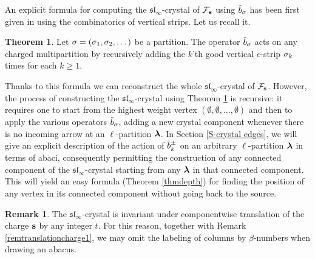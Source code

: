 \documentclass[12pt]{amsart}
\numberwithin{equation}{section}
\theoremstyle{definition}
\newtheorem{theorem}[equation]{Theorem}
\newtheorem{remark}[equation]{Remark}
\newcommand{\emp}{\emptyset}
\newcommand{\slinf}{\mathfrak{sl}_\infty}
\begin{document}
An explicit formula for computing the $\slinf$-crystal of $\mathcal{F}_{\mathbf{s}}$ using ${\tilde{b}}_\sigma$ has been first
given in \cite[Theorem 5.11]{Gerber2016a} using the combinatorics of vertical strips. Let us recall it.

\begin{theorem}\label{thmverticalstrips} Let $\sigma=(\sigma_1,\sigma_2,\dots)$ be a partition.
The operator ${\tilde{b}}_\sigma$ acts on any charged multipartition by recursively adding 
the $k$'th good vertical $e$-strip $\sigma_k$ times for each $k\geq1$.
\end{theorem}

Thanks to this formula we can reconstruct the whole $\slinf$-crystal of $\mathcal{F}_{\mathbf{s}}$. 
However, the process of constructing the $\slinf$-crystal using Theorem \ref{thmverticalstrips} is recursive: it requires one to start from the highest weight vertex $(\emp,\emp,\dots,\emp)$
and then to apply the various operators ${\tilde{b}}_\sigma$, adding a new crystal component whenever there is no incoming arrow at an $\ell$-partition $\boldsymbol{\lambda}$.
In Section \ref{S-crystal edges}, we will give an explicit description of the action of ${\tilde{b}}^\pm_k$ on an arbitrary $\ell$-partition $\boldsymbol{\lambda}$ in terms of abaci, consequently permitting the construction of any connected component of the $\slinf$-crystal starting from any $\boldsymbol{\lambda}$ in that connected component.
This will yield an easy formula (Theorem \ref{thmdepth}) for finding the position of any vertex in its connected component without going back to the source.

\begin{remark}\label{remtranslationcharge2}
The $\slinf$-crystal is invariant under componentwise translation of the charge $\mathbf{s}$ by any integer $t$.
For this reason, together with Remark \ref{remtranslationcharge1}, we may omit the labeling of columns by $\beta$-numbers when drawing an abacus.
\end{remark}
\end{document}
